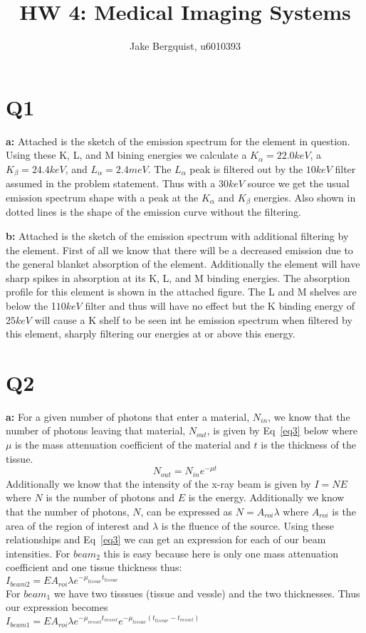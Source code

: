 \documentclass[12pt]{article}
\begin{document}
\title{HW 4: Medical Imaging Systems}
\author{Jake Bergquist, u6010393 }
\maketitle

\section{Q1}
\noindent\textbf{a: } Attached is the sketch of the emission spectrum for the element in question. Using these K, L, and M bining energies we calculate a $K_\alpha = 22.0 keV$, a $K_\beta = 24.4 keV$, and $L_\alpha = 2.4 meV$. The $L_\alpha$ peak is filtered out by the $10 keV$ filter assumed in the problem statement. Thus with a $30 keV$ source we get the usual emission spectrum shape with a peak at the $K_\alpha$ and $K_\beta$ energies. Also shown in dotted lines is the shape of the emission curve without the filtering.

\noindent\textbf{b: } Attached is the sketch of the emission spectrum with additional filtering by the element. First of all we know that there will be a decreased emission due to the general blanket absorption of the element. Additionally the element will have sharp spikes in absorption at its K, L, and M binding energies. The absorption profile for this element is shown in the attached figure. The L and M shelves are below the 1$10keV$ filter and thus will have no effect but the K binding energy of $25 keV$ will cause a K shelf to be seen int he emission spectrum when filtered by this element, sharply filtering our energies at or above this energy.

\section{Q2}
\noindent\textbf{a: } 
For a given number of photons that enter a material, $N_{in}$, we know that the number of photons leaving that material, $N_{out}$, is given by Eq~\ref{eq3} below where $\mu$ is the mass attenuation coefficient of the material and $t$ is the thickness of the tissue.
 \begin{equation}
 N_{out} = N_{in}e^{-\mu t}
 \label{eq3}
 \end{equation}
\noindent Additionally we know that the intensity of the x-ray beam is given by $I = NE$ where $N$ is the number of photons and $E$ is the energy. Additionally we know that the number of photons, $N$, can be expressed as $N = A_{roi}\lambda$ where $A_{roi}$ is the area of the region of interest and $\lambda$ is the fluence of the source. Using these relationships and Eq~\ref{eq3} we can get an expression for each of our beam intensities. For $beam_2$ this is easy because here is only one mass attenuation coefficient and one tissue thickness thus:\\ $I_{beam2} = EA_{roi}\lambda e^{-\mu_{tissue}t_{tissue}}$\\ For $beam_1$ we have two tisssues (tissue and vessle) and the two thicknesses. Thus our expression becomes \\$I_{beam1} =EA_{roi}\lambda e^{-\mu_{vessel}t_{vessel}}e^{-\mu_{tissue}(t_{tissue}-t_{vessel})}$\\
\end{document}
